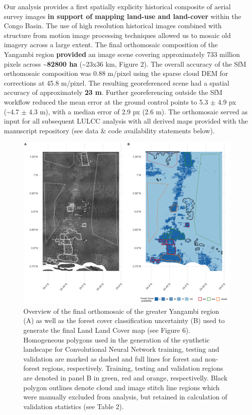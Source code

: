 \documentclass[remote sensing,article,submit,moreauthors,pdftex]{mdpi}
\begin{document}
Our analysis provides a first spatially explicity historical composite
of aerial survey images \textbf{in support of mapping land-use and
land-cover} within the Congo Basin. The use of high resolution
historical images combined with structure from motion image processing
techniques allowed us to mosaic old imagery across a large extent. The
final orthomosaic composition of the Yangambi region \textbf{provided}
an image scene covering approximately 733 million pixels across
\textbf{\textasciitilde{}82800 ha} (\textasciitilde{}23x36 km, Figure
2). The overall accuracy of the SfM orthomosaic composition was 0.88
m/pixel using the sparse cloud DEM for corrections at 45.8 m/pixel. The
resulting georeferenced scene had a spatial accuracy of approximately
\textbf{23 m}. Further georeferencing outside the SfM workflow reduced
the mean error at the ground control points to 5.3 \(\pm\) 4.9 px
(\textasciitilde{}4.7 \(\pm\) 4.3 m), with a median error of 2.9 px (2.6
m). The orthomosaic served as input for all subsequent LULCC analysis
with all derived maps provided with the manuscript repository (see data
\& code availability statements below).

\begin{figure}

{\centering \includegraphics[width=1\linewidth]{./figures/orthomosaic_maps} 

}

\caption{Overview of the final orthomosaic of the greater Yangambi region (A) as well as the forest cover classification uncertainty (B) used to generate the final Land Land Cover map (see Figure 6). Homogeneous polygons used in the generation of the synthetic landscape for Convolutional Neural Network training, testing and validation are marked as dashed and full lines for forest and non-forest regions, respectively. Training, testing and validation regions are denoted in panel B in green, red and orange, respectivelly. Black polygon outlines denote cloud and image stitch line regions which were manually excluded from analysis, but retained in calculation of validation statistics (see Table 2).}\label{fig:unnamed-chunk-6}
\end{figure}
\end{document}
